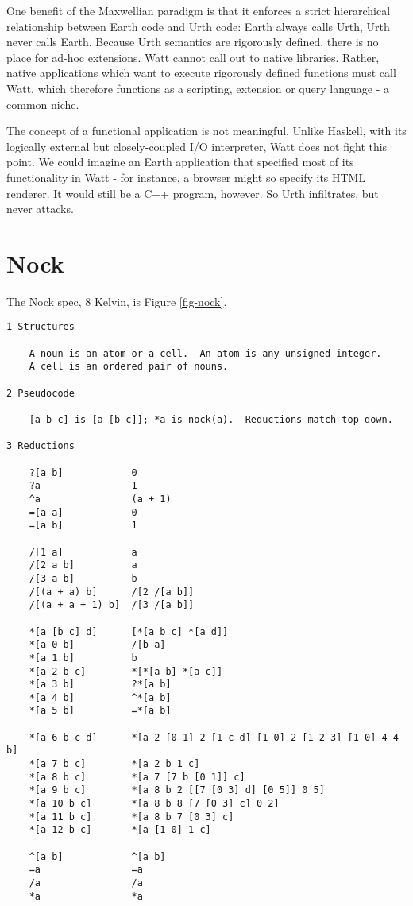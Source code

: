 \documentclass[10pt, nocopyrightspace]{sigplanconf}
\begin{document}
One benefit of the Maxwellian paradigm is that it enforces a
strict hierarchical relationship between Earth code and Urth
code: Earth always calls Urth, Urth never calls Earth.  Because
Urth semantics are rigorously defined, there is no place for
ad-hoc extensions.  Watt cannot call out to native libraries.
Rather, native applications which want to execute rigorously
defined functions must call Watt, which therefore functions as a
scripting, extension or query language - a common niche.

The concept of a functional application is not meaningful.  Unlike Haskell,
with its logically external but closely-coupled I/O interpreter, Watt does not
fight this point.  We could imagine an Earth application that specified
most of its functionality in Watt - for instance, a browser might so specify
its HTML renderer.  It would still be a C++ program, however.  So Urth
infiltrates, but never attacks.

\section{Nock}

The Nock spec, 8 Kelvin, is Figure \ref{fig-nock}.

\begin{figure*}[ht]
\begin{center}
\makebox[\textwidth]{\hrulefill}
\begin{verbatim}
1 Structures

    A noun is an atom or a cell.  An atom is any unsigned integer.  
    A cell is an ordered pair of nouns.

2 Pseudocode

    [a b c] is [a [b c]]; *a is nock(a).  Reductions match top-down.

3 Reductions

    ?[a b]            0
    ?a                1
    ^a                (a + 1)
    =[a a]            0
    =[a b]            1

    /[1 a]            a
    /[2 a b]          a
    /[3 a b]          b
    /[(a + a) b]      /[2 /[a b]]
    /[(a + a + 1) b]  /[3 /[a b]]

    *[a [b c] d]      [*[a b c] *[a d]]
    *[a 0 b]          /[b a]
    *[a 1 b]          b
    *[a 2 b c]        *[*[a b] *[a c]]
    *[a 3 b]          ?*[a b]
    *[a 4 b]          ^*[a b]
    *[a 5 b]          =*[a b]

    *[a 6 b c d]      *[a 2 [0 1] 2 [1 c d] [1 0] 2 [1 2 3] [1 0] 4 4 b]
    *[a 7 b c]        *[a 2 b 1 c]
    *[a 8 b c]        *[a 7 [7 b [0 1]] c]
    *[a 9 b c]        *[a 8 b 2 [[7 [0 3] d] [0 5]] 0 5]
    *[a 10 b c]       *[a 8 b 8 [7 [0 3] c] 0 2]
    *[a 11 b c]       *[a 8 b 7 [0 3] c]
    *[a 12 b c]       *[a [1 0] 1 c]

    ^[a b]            ^[a b]
    =a                =a
    /a                /a
    *a                *a
\end{verbatim}
\end{center}
\caption{Nock 8K}
\label{fig-nock}
\end{figure*}
\end{document}

